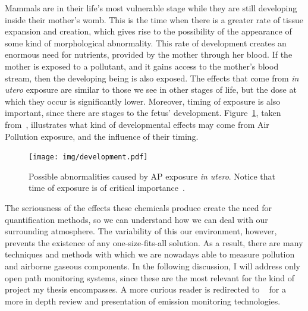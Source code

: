 Mammals are in their life's most vulnerable stage while they are still
developing inside their mother's womb. This is the time when there is a
greater rate of tissue expansion and creation, which gives rise to the
possibility of the appearance of some kind of morphological abnormality.
This rate of development creates an enormous need for nutrients,
provided by the mother through her blood. If the mother is exposed to a
pollutant, and it gains access to the mother's blood stream, then the
developing being is also exposed. The effects that come from \emph{in
utero} exposure are similar to those we see in other stages of life, but
the dose at which they occur is significantly lower. Moreover, timing of
exposure is also important, since there are stages to the fetus'
development. Figure~\ref{fig:AP_in_utero}, taken
from~\cite{Vallero2014}, illustrates what kind of developmental effects
may come from Air Pollution exposure, and the influence of their timing.

\begin{figure}[htpb]
    \centering
    \texttt{[image: img/development.pdf]}
    \caption{Possible abnormalities caused by \gls{AP} exposure \emph{in
    utero}. Notice that time of exposure is of critical
    importance~\cite{Vallero2014}.}
    \label{fig:AP_in_utero}
\end{figure}

The seriousness of the effects these chemicals produce create the need
for quantification methods, so we can understand how we can deal with
our surrounding atmosphere. The variability of this our environment,
however, prevents the existence of any one-size-fits-all solution.  As a
result, there are many techniques and methods with which we are nowadays
able to measure pollution and airborne gaseous components. In the
following discussion, I will address only open path monitoring systems,
since these are the most relevant for the kind of project my thesis
encompasses. A more curious reader is redirected to ~\cite{Stewart1996,
Clark1997, Vallero2014} for a more in depth review and presentation of
emission monitoring technologies.

